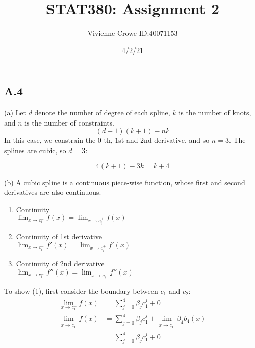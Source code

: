 \documentclass{article}
\begin{document}
    \raggedright
    \title{STAT380: Assignment 2  \\}
    \author{Vivienne Crowe ID:40071153}
    \date{4/2/21}
    
    \maketitle

    \section{}
    
    \subsection{A.4}
    

    (a) Let $d$ denote the number of degree of each spline, $k$ is the number of knots, and $n$ is the number of constraints.
    \[
        (d+1)(k+1) - nk
    \]
    In this case, we constrain the $0$-th, $1$st and $2$nd derivative, and so $n=3$. The splines are cubic, so $d=3$:

    \[
        4(k+1) - 3k = k + 4
    \]

    (b) A cubic spline is a continuous piece-wise function, whose first and second derivatives 
    are also continuous. 
    \begin{enumerate}
        \item Continuity \\
        $\lim_{x \rightarrow c_i^-} f(x) = \lim_{x \rightarrow c_i^+} f(x)$
        \item Continuity of 1st derivative \\
         $\lim_{x \rightarrow c_i^-} f'(x) = \lim_{x \rightarrow c_i^+} f'(x)$
        \item Continuity of 2nd derivative \\
        $\lim_{x \rightarrow c_i^-} f''(x) = \lim_{x \rightarrow c_i^+} f''(x)$
    \end{enumerate}

    To show (1), first consider the boundary between $c_1$ and $c_2$:
    \[ 
        \begin{aligned}
            \lim_{x \rightarrow c_1^-} f(x) & = \sum_{j=0}^4 \beta_j c_1^j + 0  \\
            \lim_{x \rightarrow c_1^+} f(x) & = \sum_{j=0}^4 \beta_j c_1^j + \lim_{x \rightarrow c_1^+}  \beta_4 b_4(x)  \\
            & = \sum_{j=0}^4 \beta_j c_1^j  + 0\\
        \end{aligned}
    \]
\end{document}
